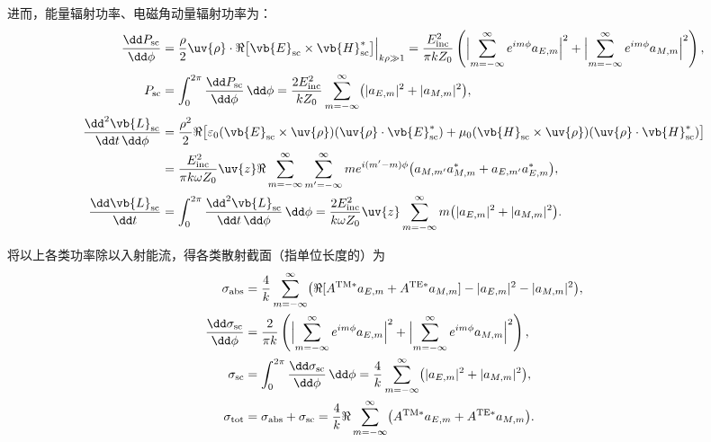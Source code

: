 进而，能量辐射功率、电磁角动量辐射功率为：
\begin{align*}
	\frac{\dd P_{\rm sc}}{\dd \phi}              & = \frac{\rho}{2} \uv{\rho} \cdot \Re\bigl[ \vb{E}_{\rm sc} \times \vb{H}_{\rm sc}^* \bigr] \Big|_{k\rho \gg 1}
	= \frac{E_{\rm inc}^2}{\pi k Z_0} \left( \Bigl| \sum_{m=-\infty}^{\infty} e^{im\phi} a_{E,m} \Bigr|^2 + \Bigl| \sum_{m=-\infty}^{\infty} e^{im\phi} a_{M,m} \Bigr|^2 \right),                                                                      \\
	P_{\rm sc}                                 & = \int_0^{2\pi} \frac{\dd P_{\rm sc}}{\dd \phi} \,\dd \phi
	= \frac{2E_{\rm inc}^2}{k Z_0} \sum_{m=-\infty}^{\infty} \bigl( |a_{E,m}|^2 + |a_{M,m}|^2 \bigr),                                                                                                                                                  \\
	\frac{\dd^2 \vb{L}_{\rm sc}}{\dd t\,\dd \phi} & = \frac{\rho^2}{2} \Re\bigl[ \varepsilon_0 (\vb{E}_{\rm sc} \times \uv{\rho})(\uv{\rho} \cdot \vb{E}_{\rm sc}^*) + \mu_0 (\vb{H}_{\rm sc} \times \uv{\rho})(\uv{\rho} \cdot \vb{H}_{\rm sc}^*) \bigr] \\
	                                           & = \frac{E_{\rm inc}^2}{\pi k \omega Z_0} \uv{z} \Re \sum_{m=-\infty}^{\infty} \sum_{m'=-\infty}^{\infty} m e^{i(m'-m)\phi} \bigl( a_{M,m'} a_{M,m}^* + a_{E,m'} a_{E,m}^* \bigr),                     \\
	\frac{\dd \vb{L}_{\rm sc}}{\dd t}            & = \int_0^{2\pi} \frac{\dd^2 \vb{L}_{\rm sc}}{\dd t\,\dd \phi} \,\dd \phi
	= \frac{2E_{\rm inc}^2}{k \omega Z_0} \uv{z} \sum_{m=-\infty}^{\infty} m \bigl( |a_{E,m}|^2 + |a_{M,m}|^2 \bigr).
\end{align*}

将以上各类功率除以入射能流，得各类散射截面（指单位长度的）为
\begin{align*}
	\sigma_{\rm abs}                   & = \frac{4}{k} \sum_{m=-\infty}^{\infty} \bigl( \Re[A^{\rm TM*} a_{E,m} + A^{\rm TE*} a_{M,m}] - |a_{E,m}|^2 - |a_{M,m}|^2 \bigr),                             \\
	\frac{\dd \sigma_{\rm sc}}{\dd \phi} & = \frac{2}{\pi k} \left( \Bigl| \sum_{m=-\infty}^{\infty} e^{im\phi} a_{E,m} \Bigr|^2 + \Bigl| \sum_{m=-\infty}^{\infty} e^{im\phi} a_{M,m} \Bigr|^2 \right), \\
	\sigma_{\rm sc}                    & = \int_0^{2\pi} \frac{\dd \sigma_{\rm sc}}{\dd \phi} \,\dd \phi
	= \frac{4}{k} \sum_{m=-\infty}^{\infty} \bigl( |a_{E,m}|^2 + |a_{M,m}|^2 \bigr),                                                                                                                   \\
	\sigma_{\rm tot}                   & = \sigma_{\rm abs} + \sigma_{\rm sc}
	= \frac{4}{k} \Re \sum_{m=-\infty}^{\infty} \bigl( A^{\rm TM*} a_{E,m} + A^{\rm TE*} a_{M,m} \bigr).
\end{align*}

